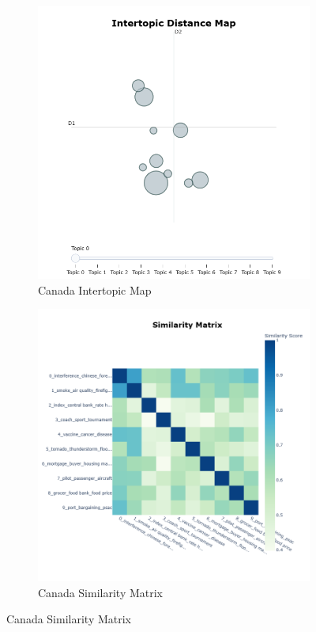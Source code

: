 \documentclass{article}
\theoremstyle{mytheoremstyle}
\theoremstyle{mytheoremstyle}
\theoremstyle{myproblemstyle}
\begin{document}
    \begin{figure}[hp]

        \centering
        \begin{subfigure}{0.45\textwidth}
            \includegraphics[width=\textwidth]{intertopic_distance_map_canada.png}
            \caption{Canada Intertopic Map}
            \label{fig:intertopic_canada}
        \end{subfigure}
        \hfill
        \begin{subfigure}{0.45\textwidth}
            \includegraphics[width=\textwidth]{similarity_matrix_canada.png}
            \caption{Canada Similarity Matrix}
            \label{fig:sim_canada}
        \end{subfigure}
        \hfill
        

\end{figure}
\end{document}
